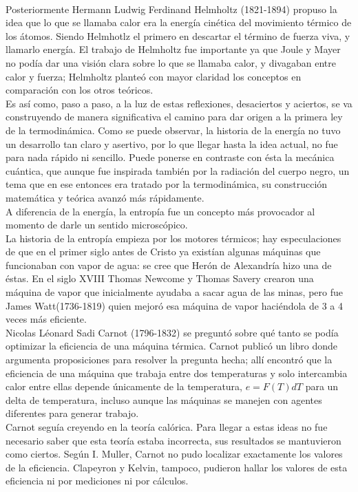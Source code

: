 \\
Posteriormente Hermann Ludwig Ferdinand Helmholtz (1821-1894) propuso la idea que lo que se llamaba calor era la energía cinética del movimiento térmico de los átomos. Siendo Helmhotlz el primero en descartar el término de fuerza viva, y llamarlo energía. El trabajo de Helmholtz fue importante ya que Joule y Mayer no podía dar una visión clara sobre lo que se llamaba calor, y divagaban entre calor y fuerza; Helmholtz planteó con mayor claridad los conceptos en comparación con los otros teóricos.
\\
Es así como, paso a paso, a la luz de estas reflexiones, desaciertos y aciertos, se va construyendo de manera significativa el camino para dar origen a la primera ley de la termodinámica. Como se puede observar, la historia de la energía no tuvo un desarrollo tan claro y asertivo, por lo que llegar hasta la idea actual, no fue para nada rápido ni sencillo. Puede ponerse en contraste con ésta la mecánica cuántica, que aunque fue inspirada también por la radiación del cuerpo negro, un tema que en ese entonces era tratado por la termodinámica, su construcción matemática y teórica avanzó más rápidamente. 
\\
A diferencia de la energía, la entropía fue un concepto más provocador al momento de darle un sentido microscópico. 
\\
La historia de la entropía empieza por los motores térmicos; hay especulaciones de que en el primer siglo antes de Cristo ya existían algunas máquinas que funcionaban con vapor de agua: se cree que Herón de Alexandría hizo una de éstas. En el siglo XVIII Thomas Newcome y Thomas Savery crearon una máquina de vapor que inicialmente ayudaba a sacar agua de las minas, pero fue James Watt(1736-1819) quien mejoró esa máquina de vapor haciéndola de 3 a 4 veces más eficiente.
\\
Nicolas Léonard Sadi Carnot (1796-1832) se preguntó sobre qué tanto se podía optimizar la eficiencia de una máquina térmica. Carnot publicó un libro donde argumenta proposiciones para resolver la pregunta hecha; allí encontró que la eficiencia de una máquina que trabaja entre dos temperaturas y solo intercambia calor entre ellas depende únicamente de la temperatura, $e=F(T)dT$ para un delta de temperatura, incluso aunque las máquinas se manejen con agentes diferentes para generar trabajo.
\\
Carnot seguía creyendo en la teoría calórica. Para llegar a estas ideas no fue necesario saber que esta teoría estaba incorrecta, sus resultados se mantuvieron como ciertos. Según I. Muller, Carnot no pudo localizar exactamente los valores de la eficiencia. Clapeyron y Kelvin, tampoco, pudieron hallar los valores de esta eficiencia ni por mediciones ni por cálculos.
